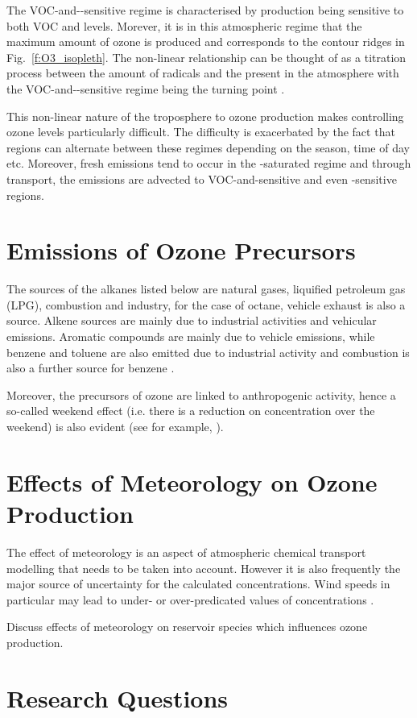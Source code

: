 The VOC-and--sensitive regime is characterised by  production being sensitive to both VOC and  levels. 
Morever, it is in this atmospheric regime that the maximum amount of ozone is produced and corresponds to the contour ridges in Fig.~\ref{f:O3_isopleth}.
The non-linear relationship can be thought of as a titration process between the amount of radicals and the  present in the atmosphere with the VOC-and--sensitive regime being the turning point \citep{Kleinman:1991, Kleinman:1994}.

This non-linear nature of the troposphere to ozone production makes controlling ozone levels particularly difficult.
The difficulty is exacerbated by the fact that regions can alternate between these regimes depending on the season, time of day etc.
Moreover, fresh emissions tend to occur in the -saturated regime and through transport, the emissions are advected to VOC-and-sensitive and even -sensitive regions.

\section{Emissions of Ozone Precursors} \label{s:precursor_emissions}


The sources of the alkanes listed below are natural gases, liquified petroleum gas (LPG), combustion and industry, for the case of octane, vehicle exhaust is also a source. 
Alkene sources are mainly due to industrial activities and vehicular emissions. 
Aromatic compounds are mainly due to vehicle emissions, while benzene and toluene are also emitted due to industrial activity and combustion is also a further source for benzene \citep{Arsene:2009}.

Moreover, the precursors of ozone are linked to anthropogenic activity, hence a so-called weekend effect (i.e. there is a reduction on  concentration over the weekend) is also evident (see for example, \citep{Koo:2012}). 

\section{Effects of Meteorology on Ozone Production} \label{s:meteo_ozone}

The effect of meteorology is an aspect of atmospheric chemical transport modelling that needs to be taken into account. 
However it is also frequently the major source of uncertainty for the calculated  concentrations. 
Wind speeds in particular may lead to under- or over-predicated values of  concentrations \citep{Sillman:1999}. 

Discuss effects of meteorology on reservoir species which influences ozone production.

\section{Research Questions} \label{s:research_questions}

